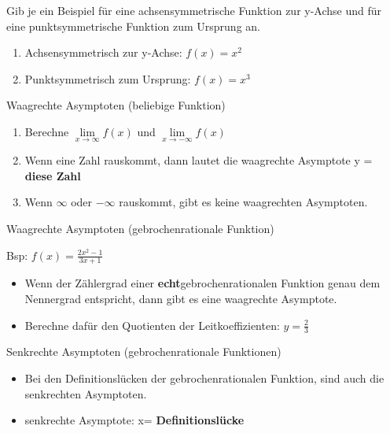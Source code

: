 \documentclass[paper=a6,landscape,ngerman,twoside=true,fontsize=12pt]{scrartcl}
\begin{document}
\begin{frage}
	Gib je ein Beispiel für eine achsensymmetrische Funktion zur y-Achse und für eine punktsymmetrische Funktion zum Ursprung an.
\end{frage}
\begin{antwort}
	\begin{enumerate}
		\item Achsensymmetrisch zur y-Achse: $f(x)=x^2$
		\item Punktsymmetrisch zum Ursprung: $f(x)=x^3$
	\end{enumerate}
\end{antwort}
\begin{frage}
	Waagrechte Asymptoten (beliebige Funktion)
\end{frage}
\begin{antwort}
	\begin{enumerate} 
		\item Berechne $\lim\limits_{x \rightarrow \infty}{f(x)}$ und $\lim\limits_{x \rightarrow -\infty}{f(x)}$	
		
		\item Wenn eine Zahl rauskommt, dann lautet die waagrechte Asymptote y = \textbf{diese Zahl}
		
		\item Wenn $\infty$ oder  $-\infty$ rauskommt, gibt es keine waagrechten Asymptoten.
			
	\end{enumerate} 
\end{antwort}
\begin{frage}
	Waagrechte Asymptoten (gebrochenrationale Funktion)\bigskip
	
	Bsp: $f(x)=\frac{2x^2-1}{3x+1}$
\end{frage}
\begin{antwort}
	\begin{itemize} 
		\item \large Wenn der Zählergrad einer \textbf{echt}gebrochenrationalen Funktion genau dem Nennergrad entspricht, dann gibt es eine waagrechte Asymptote.	
		\item Berechne dafür den Quotienten der Leitkoeffizienten: $y=\frac{2}{3}$	
	\end{itemize} 
\end{antwort}
\begin{frage}
	Senkrechte Asymptoten (gebrochenrationale Funktionen)
\end{frage}
\begin{antwort}
	\begin{itemize} 
		\item \large Bei den Definitionslücken der gebrochenrationalen Funktion, sind auch die senkrechten Asymptoten.		
		\item senkrechte Asymptote: x= \textbf{Definitionslücke}		
	\end{itemize} 
\end{antwort}
\end{document}

